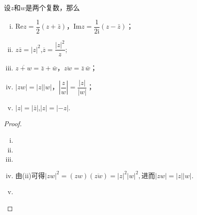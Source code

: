 \documentclass[../../main.tex]{subfiles}
\begin{document}
\begin{proposition}[复数运算性质]\label{proposition:复数运算性质}
设\(z\)和\(w\)是两个复数，那么
\begin{enumerate}[(i)]
\item \(\mathrm{Re}z = \dfrac{1}{2}(z + \bar{z})\)，\(\mathrm{Im}z = \dfrac{1}{2\mathrm{i}}(z - \bar{z})\)；

\item \(z\bar{z} = |z|^2\),\(\overline{z} = \dfrac{|z|^2}{z}\);

\item \(\overline{z + w} = \bar{z} + \bar{w}\)，\(\overline{zw} = \bar{z}\,\bar{w}\)；

\item\(|zw| = |z||w|\)，\(\left| \dfrac{z}{w} \right| = \dfrac{|z|}{|w|}\)；

\item\(|z| = |\bar{z}|\),$|z|=|-z|$.
\end{enumerate}
\end{proposition}
\begin{proof}
\begin{enumerate}[(i)]
\item 

\item 

\item

\item 由(ii)可得$|zw|^2 = (zw)(\overline{zw}) = |z|^2|w|^2,$进而\(|zw| = |z||w|\).

\item
\end{enumerate}

\end{proof}
\end{document}
